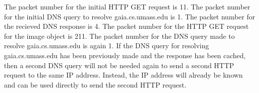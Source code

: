 The packet number for the initial HTTP GET request is 11.
\newline
\newline
The packet number for the initial DNS query to resolve gaia.cs.umass.edu is 1.
\newline
\newline
The packet number for the recieved DNS response is 4.
\newline
\newline
The packet number for the HTTP GET request for the image object is 211.
\newline
\newline
The packet number for the DNS query made to resolve gaia.cs.umass.edu is again 1.
\newline
\newline
If the DNS query for resolving gaia.cs.umass.edu has been previously made and the response has been cached, then a second DNS query will not be needed again to send a second HTTP request to the same IP address. Instead, the IP address will already be known and can be used directly to send the second HTTP request.